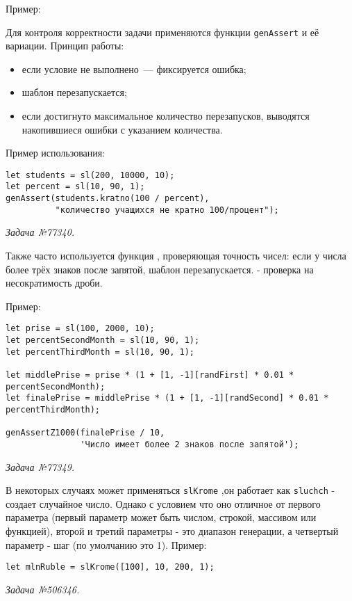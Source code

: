 Пример: 


Для контроля корректности задачи применяются функции \texttt{genAssert} и её вариации. Принцип работы:  
\begin{itemize}
    \item если условие не выполнено~--- фиксируется ошибка;
    \item шаблон перезапускается;
    \item если достигнуто максимальное количество перезапусков, выводятся накопившиеся ошибки с указанием количества.
\end{itemize}

Пример использования:
\begin{lstlisting}
let students = sl(200, 10000, 10);
let percent = sl(10, 90, 1); 
genAssert(students.kratno(100 / percent),
          "количество учащихся не кратно 100/процент");
\end{lstlisting}
\textsl{Задача №77340.}

Также часто используется функция , проверяющая точность чисел: если у числа более трёх знаков после запятой, шаблон перезапускается.  
 - проверка на несократимость дроби.

Пример:
\begin{lstlisting}
let prise = sl(100, 2000, 10);
let percentSecondMonth = sl(10, 90, 1);
let percentThirdMonth = sl(10, 90, 1);

let middlePrise = prise * (1 + [1, -1][randFirst] * 0.01 * percentSecondMonth);
let finalePrise = middlePrise * (1 + [1, -1][randSecond] * 0.01 * percentThirdMonth);

genAssertZ1000(finalePrise / 10,
               'Число имеет более 2 знаков после запятой');
\end{lstlisting}
\textsl{Задача №77349.}



В некоторых случаях может применяться \texttt{slKrome} ,он работает как \texttt{sluchch} - создает случайное число. Однако с условием что оно  отличное от
		первого параметра (первый параметр может быть числом, строкой, массивом или функцией),
		второй и третий параметры - это диапазон генерации, а четвертый параметр - шаг (по умолчанию это 1).
Пример:
\begin{lstlisting}
let mlnRuble = slKrome([100], 10, 200, 1);
\end{lstlisting}
\textsl{Задача №506346.}

